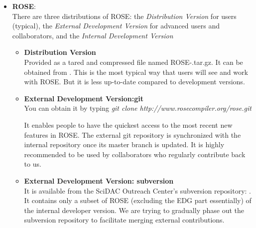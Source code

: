 \begin{itemize}
   \item {\bf ROSE}: \\
     There are three distributions of ROSE: the {\it Distribution Version} for users
    (typical), the {\it External Development Version} for advanced users and collaborators, 
     and the {\it Internal Development Version}
     \begin{itemize}
       \item {\bf Distribution Version} \\
       Provided as a tared and compressed file named ROSE-\VersionNumber.tar.gz.
       It can be obtained from . 
       This is the most typical way that users will see and work with ROSE. But it is less
       up-to-date compared to development versions.

       \item {\bf External Development Version:git} \\
       You can obtain it by typing \textit{git clone
       http://www.rosecompiler.org/rose.git} 

       It enables people to have the quickest access to the most recent new features in ROSE.  
       The external git repository is synchronized with the
       internal repository once its master branch is updated. 
       It is highly recommended to be used by collaborators who regularly contribute back to us. 


       \item {\bf External Development Version: subversion} \\
       It is available from the SciDAC Outreach Center's subversion repository:
       .
       It contains only a subset of ROSE (excluding the EDG part essentially) of the internal developer version. 
       We are trying to gradually phase out the subversion repository to
       facilitate merging external contributions.


\end{itemize}
\end{itemize}
